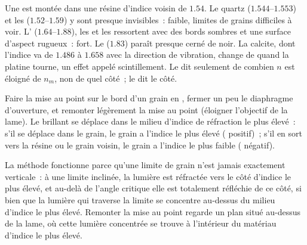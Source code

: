 Une  est montée dans une résine d'indice voisin de $1.54$.
Le quartz ($1.544$--$1.553$) et les  ($1.52$--$1.59$) y sont presque
invisibles~:  faible, limites de grains difficiles à voir. L'
($1.64$--$1.88$), les  et les  ressortent avec des bords
sombres et une surface d'aspect rugueux~:  fort. Le  ($1.83$) paraît
presque cerné de noir. La calcite, dont l'indice va de $1.486$ à $1.658$ avec la
direction de vibration, change de  quand la platine tourne, un effet appelé
scintillement.
Le  dit seulement de combien $n$ est éloigné de $n_m$, non de quel côté~; le
 dit le côté.

\begin{method}\label{met:b1:optical-mineralogy:becke}
Faire la mise au point sur le bord d'un grain en ,
fermer un peu le diaphragme d'ouverture, et remonter légèrement la mise au point
(éloigner l'objectif de la lame). Le  brillant se déplace dans le
milieu d'indice de réfraction le plus élevé~: s'il se déplace dans le grain, le
grain a l'indice le plus élevé ( positif)~; s'il en sort vers la résine ou
le grain voisin, le grain a l'indice le plus faible ( négatif).
\end{method}

La méthode fonctionne parce qu'une limite de grain n'est jamais exactement
verticale~: à une limite inclinée, la lumière est réfractée vers le côté d'indice
le plus élevé, et au-delà de l'angle critique elle est totalement réfléchie de ce
côté, si bien que la lumière qui traverse la limite se concentre au-dessus du
milieu d'indice le plus élevé. Remonter la mise au point regarde un plan situé
au-dessus de la lame, où cette lumière concentrée se trouve à l'intérieur du
matériau d'indice le plus élevé.

